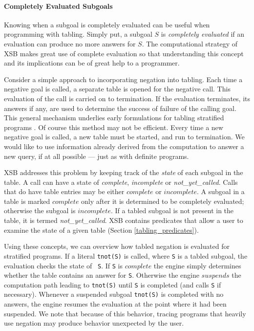 \paragraph*{Completely Evaluated Subgoals}

Knowing when a subgoal is completely evaluated can be useful when
programming with tabling.  Simply put, a subgoal $S$ is {\em completely
evaluated} if an evaluation can produce no more answers for $S$.  The
computational strategy of XSB makes great use of complete evaluation
so that understanding this concept and its implications can be of
great help to a programmer.

Consider a simple approach to incorporating negation into tabling.
Each time a negative goal is called, a separate table is opened for
the negative call.  This evaluation of the call is carried on to
termination.  If the evaluation terminates, its answers if any, are
used to determine the success of failure of the calling goal.  This
general mechanism underlies early formulations for tabling stratified
programs \cite{KeTo88,Seki89}.  Of course this method may not be
efficient.  Every time a new negative goal is called, a new table must
be started, and run to termination.  We would like to use information
already derived from the computation to answer a new query, if at all
possible --- just as with definite programs.

XSB addresses this problem by keeping track of the {\em state} of each
subgoal in the table.  A call can have a state of {\em complete}, {\em
incomplete} or {\em not\_yet\_called}.  
Calls that do have table entries may be either $complete$ or
$incomplete$.  A subgoal in a table is marked $complete$ only after it
is determined to be completely evaluated; otherwise the subgoal is
$incomplete$.  If a tabled subgoal is not present in the table, it is
termed {\em not\_yet\_called}.  XSB contains predicates that allow a
user to examine the state of a given table (Section
\ref{tabling_predicates}).

Using these concepts, we can overview how tabled negation is evaluated
for stratified programs.  If a literal {\tt tnot(S)} is called, where
{\tt S} is a tabled subgoal, the evaluation checks the state of {\tt
S}.  If {\tt S} is $complete$ the engine simply determines whether the
table contains an answer for {\tt S}.  Otherwise the engine $suspends$
the computation path leading to {\tt tnot(S)} until {\tt S} is
completed (and calls {\tt S} if necessary).  Whenever a suspended
subgoal {\tt tnot(S)} is completed with no answers, the engine resumes
the evaluation at the point where it had been suspended.  We note that
because of this behavior, tracing programs that heavily use negation
may produce behavior unexpected by the user.


